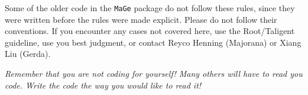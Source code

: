     Some of the older code in the \nolinkurl{MaGe}    package do not follow these rules, since they were written before the rules 
   were made explicit. Please do not follow their conventions. If you 
   encounter any cases not covered here, use the Root/Taligent guideline, 
   use you best judgment, or contact Reyco Henning (Majorana) or 
   Xiang Liu (Gerda).
 
\emph{Remember that you are not coding for yourself! Many others will have to read you code. Write the code the way you would like to read it!}  


